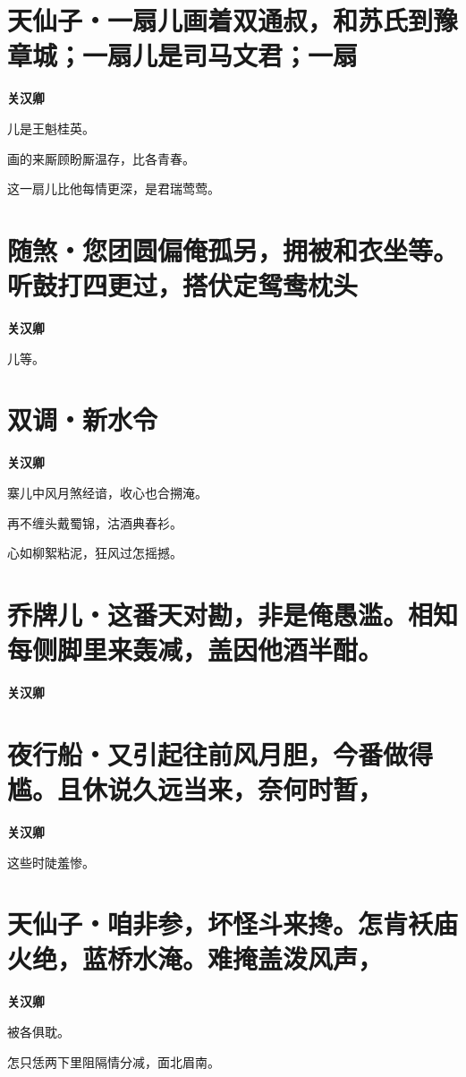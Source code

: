 \documentclass[12pt,a4paper]{ctexbook}
\begin{document}
\section{天仙子・一扇儿画着双通叔，和苏氏到豫章城；一扇儿是司马文君；一扇}
\textbf{关汉卿}\par\vspace{0.5em}
儿是王魁桂英。\par
画的来厮顾盼厮温存，比各青春。\par
这一扇儿比他每情更深，是君瑞莺莺。\par

\section{随煞・您团圆偏俺孤另，拥被和衣坐等。听鼓打四更过，搭伏定鸳鸯枕头}
\textbf{关汉卿}\par\vspace{0.5em}
儿等。\par

\section{双调・新水令}
\textbf{关汉卿}\par\vspace{0.5em}
寨儿中风月煞经谙，收心也合搠淹。\par
再不缠头戴蜀锦，沽酒典春衫。\par
心如柳絮粘泥，狂风过怎摇撼。\par

\section{乔牌儿・这番天对勘，非是俺愚滥。相知每侧脚里来轰减，盖因他酒半酣。}
\textbf{关汉卿}\par\vspace{0.5em}

\section{夜行船・又引起往前风月胆，今番做得尴。且休说久远当来，奈何时暂，}
\textbf{关汉卿}\par\vspace{0.5em}
这些时陡羞惨。\par

\section{天仙子・咱非参，坏怪斗来搀。怎肯袄庙火绝，蓝桥水淹。难掩盖泼风声，}
\textbf{关汉卿}\par\vspace{0.5em}
被各俱耽。\par
怎只恁两下里阻隔情分减，面北眉南。\par
\end{document}
